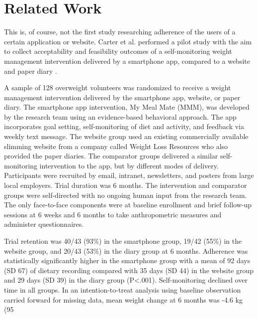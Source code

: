 \section{Related Work}
This is, of course, not the first study researching adherence of the users of a certain application or website. Carter et al. performed a pilot study with the aim to collect acceptability and feasibility outcomes of a self-monitoring weight management intervention delivered by a smartphone app, compared to a website and paper diary \cite{carter2013adherence}. 

A sample of 128 overweight volunteers was randomized to receive a weight management intervention delivered by the smartphone app, website, or paper diary. The smartphone app intervention, My Meal Mate (MMM), was developed by the research team using an evidence-based behavioral approach. The app incorporates goal setting, self-monitoring of diet and activity, and feedback via weekly text message. The website group used an existing commercially available slimming website from a company called Weight Loss Resources who also provided the paper diaries. The comparator groups delivered a similar self-monitoring intervention to the app, but by different modes of delivery. Participants were recruited by email, intranet, newsletters, and posters from large local employers. Trial duration was 6 months. The intervention and comparator groups were self-directed with no ongoing human input from the research team. The only face-to-face components were at baseline enrollment and brief follow-up sessions at 6 weeks and 6 months to take anthropometric measures and administer questionnaires.

Trial retention was 40/43 (93\%) in the smartphone group, 19/42 (55\%) in the website group, and 20/43 (53\%) in the diary group at 6 months. Adherence was statistically significantly higher in the smartphone group with a mean of 92 days (SD 67) of dietary recording compared with 35 days (SD 44) in the website group and 29 days (SD 39) in the diary group (P<.001). Self-monitoring declined over time in all groups. In an intention-to-treat analysis using baseline observation carried forward for missing data, mean weight change at 6 months was -4.6 kg (95%

